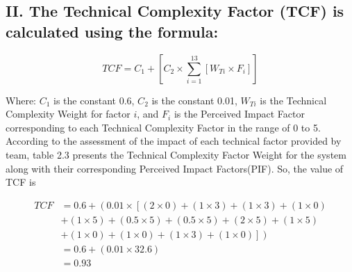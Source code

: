 \documentclass[english,12pt,a4paper]{report}
\begin{document}
		\subsection*{II. The Technical Complexity Factor (TCF) is calculated using the formula:}
		
		\begin{equation}
			TCF = C_{1} + \left[C_{2} \times \sum_{i=1}^{13} \left[W_{Ti} \times F_i\right]\right]
		\end{equation}
		
		Where:
		\( C_{1} \) is the constant 0.6,
		\( C_{2} \) is the constant 0.01,
		\( W_{Ti} \) is the Technical Complexity Weight for factor \( i \), and
		\( F_i \) is the Perceived Impact Factor corresponding to each Technical Complexity Factor in the range of 0 to 5.\\
		According to the assessment of the impact of each technical factor provided by team, table 2.3 presents the Technical Complexity Factor Weight for the system along with their corresponding Perceived Impact Factors(PIF). So, the value of TCF is
		
		\begin{equation}
			\begin{aligned}
				TCF &= 0.6 + \left(0.01 \times \left[(2 \times 0) + (1 \times 3) + (1 \times 3) + (1 \times 0) \right.\right. \\
				&\left.\left. + (1 \times 5) + (0.5 \times 5) + (0.5 \times 5) + (2 \times 5) + (1 \times 5) \right.\right. \\
				&\left.\left. + (1 \times 0) + (1 \times 0) + (1 \times 3) + (1 \times 0)\right]\right) \\
				&= 0.6 + \left(0.01 \times 32.6\right) \\
				&= 0.93
			\end{aligned}
		\end{equation}
		
\end{document}
